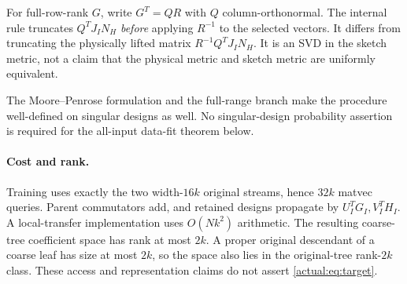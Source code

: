 \documentclass[11pt,oneside,openany,a4paper]{book}
\numberwithin{equation}{chapter}
\theoremstyle{definition}
\theoremstyle{remark}
\begin{document}
For full-row-rank $G$, write $G^T=QR$ with $Q$ column-orthonormal. The internal rule truncates $Q^T J_I N_H$ \emph{before} applying $R^{-1}$ to the selected vectors. It differs from truncating the physically lifted matrix $R^{-1}Q^T J_I N_H$. It is an SVD in the sketch metric, not a claim that the physical metric and sketch metric are uniformly equivalent.

The Moore--Penrose formulation and the full-range branch make the procedure well-defined on singular designs as well. No singular-design probability assertion is required for the all-input data-fit theorem below.

\paragraph{Cost and rank.}
Training uses exactly the two width-$16k$ original streams, hence $32k$ matvec queries. Parent commutators add, and retained designs propagate by $U_I^TG_I,V_I^TH_I$. A local-transfer implementation uses $O(Nk^2)$ arithmetic. The resulting coarse-tree coefficient space has rank at most $2k$. A proper original descendant of a coarse leaf has size at most $2k$, so the space also lies in the original-tree rank-$2k$ class. These access and representation claims do not assert \eqref{actual:eq:target}.
\end{document}
